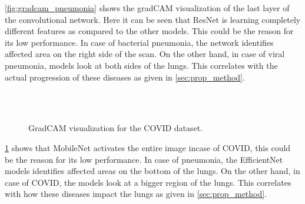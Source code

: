 \documentclass[10pt,twocolumn,letterpaper]{article}
\begin{document}
\cref{fig:gradcam_pneumonia} shows the gradCAM visualization of the last layer of the convolutional network.
Here it can be seen that ResNet is learning completely different features as compared to the other 
models. This could be the reason for its low performance. In case of bacterial pneumonia, the network identifies 
affected area on the right side of the scan. On the other hand, in case of viral pneumonia, models look at both 
sides of the lungs. This correlates with the actual progression of these diseases as given in \cref{sec:prop_method}.



\begin{figure}
  \\
  \\
  \caption{GradCAM visualization for the COVID dataset.}
  \label{fig:gradcam_covid}
\end{figure}

\cref{fig:gradcam_covid} shows that MobileNet activates the entire image incase of COVID, this could be the 
reason for its low performance. In case of pneumonia, the EfficientNet models identifies 
affected areas on the bottom of the lungs. On the other hand, in case of COVID, the models look at a bigger 
region of the lungs. This correlates with how these diseases impact the lungs as given in \cref{sec:prop_method}.
\end{document}
